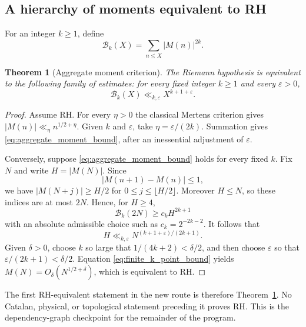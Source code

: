 \documentclass[11pt]{amsart}
\numberwithin{equation}{section}
\theoremstyle{plain}
\newtheorem{theorem}{Theorem}[section]
\theoremstyle{definition}
\theoremstyle{remark}
\newcommand{\Mert}{M}
\newcommand{\eps}{\varepsilon}
\begin{document}
\subsection{A hierarchy of moments equivalent to RH}

For an integer $k\geq1$, define
\begin{equation}
\mathcal B_k(X)=\sum_{n\leq X}|\Mert(n)|^{2k}.
\label{eq:ordinary_time_moment}
\end{equation}

\begin{theorem}[Aggregate moment criterion]
\label{thm:aggregate_moment_criterion}
The Riemann hypothesis is equivalent to the following family of estimates: for
every fixed integer $k\geq1$ and every $\eps>0$,
\begin{equation}
\mathcal B_k(X)
\ll_{k,\eps}X^{k+1+\eps}.
\label{eq:aggregate_moment_bound}
\end{equation}
\end{theorem}

\begin{proof}
Assume RH.  For every $\eta>0$ the classical Mertens criterion gives
$|\Mert(n)|\ll_\eta n^{1/2+\eta}$.  Given $k$ and $\eps$, take
$\eta=\eps/(2k)$.  Summation gives
\eqref{eq:aggregate_moment_bound}, after an inessential adjustment of
$\eps$.

Conversely, suppose \eqref{eq:aggregate_moment_bound} holds for every fixed
$k$.  Fix $N$ and write $H=|\Mert(N)|$.  Since
\begin{equation}
|\Mert(n+1)-\Mert(n)|\leq1,
\label{eq:mertens_lipschitz}
\end{equation}
we have $|\Mert(N+j)|\geq H/2$ for
$0\leq j\leq\lfloor H/2\rfloor$.  Moreover $H\leq N$, so these indices are at
most $2N$.  Hence, for $H\geq4$,
\begin{equation}
\mathcal B_k(2N)
\geq
c_k H^{2k+1}
\label{eq:spike_costs_interval}
\end{equation}
with an absolute admissible choice such as $c_k=2^{-2k-2}$.  It follows that
\begin{equation}
H
\ll_{k,\eps}
N^{(k+1+\eps)/(2k+1)}.
\label{eq:finite_k_point_bound}
\end{equation}
Given $\delta>0$, choose $k$ so large that
$1/(4k+2)<\delta/2$, and then choose $\eps$ so that
$\eps/(2k+1)<\delta/2$.  Equation
\eqref{eq:finite_k_point_bound} yields
$\Mert(N)=O_\delta(N^{1/2+\delta})$, which is equivalent to RH.
\end{proof}

The first RH-equivalent statement in the new route is therefore
Theorem~\ref{thm:aggregate_moment_criterion}.  No Catalan, physical, or
topological statement preceding it proves RH.  This is the dependency-graph
checkpoint for the remainder of the program.
\end{document}
